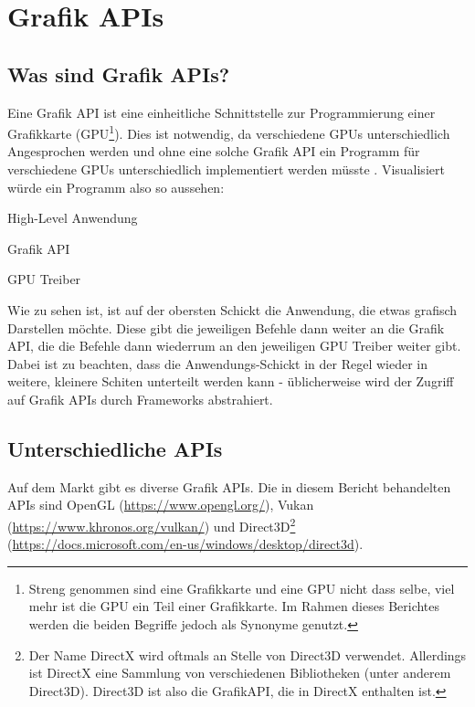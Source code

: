 
\section{Grafik APIs}

\subsection{Was sind Grafik APIs?}
Eine Grafik API ist eine einheitliche Schnittstelle zur Programmierung einer Grafikkarte (GPU\footnote{Streng genommen sind eine Grafikkarte und eine GPU nicht dass selbe, viel mehr ist die GPU ein Teil einer Grafikkarte. Im Rahmen dieses Berichtes werden die beiden Begriffe jedoch als Synonyme genutzt.}). Dies ist notwendig, da verschiedene GPUs unterschiedlich Angesprochen werden und ohne eine solche Grafik API ein Programm für verschiedene GPUs unterschiedlich implementiert werden müsste \cite{samsung_what_is_a_graphics_api}. Visualisiert würde ein Programm also so aussehen:

\begin{tcolorbox}
    \begin{tcolorbox}
        \begin{center}
            High-Level Anwendung
        \end{center}
    \end{tcolorbox}
    \begin{tcolorbox}
        \begin{center}
            Grafik API
        \end{center}
    \end{tcolorbox}
    \begin{tcolorbox}
        \begin{center}
            GPU Treiber
        \end{center}
    \end{tcolorbox}
\end{tcolorbox}

Wie zu sehen ist, ist auf der obersten Schickt die Anwendung, die etwas grafisch Darstellen möchte. Diese gibt die jeweiligen Befehle dann weiter an die Grafik API, die die Befehle dann wiederrum an den jeweiligen GPU Treiber weiter gibt. Dabei ist zu beachten, dass die Anwendungs-Schickt in der Regel wieder in weitere, kleinere Schiten unterteilt werden kann - üblicherweise wird der Zugriff auf Grafik APIs durch Frameworks abstrahiert.

\subsection{Unterschiedliche APIs}
Auf dem Markt gibt es diverse Grafik APIs. Die in diesem Bericht behandelten APIs sind OpenGL (\url{https://www.opengl.org/}), Vukan (\url{https://www.khronos.org/vulkan/}) und Direct3D\footnote{Der Name DirectX wird oftmals an Stelle von Direct3D verwendet. Allerdings ist DirectX eine Sammlung von verschiedenen Bibliotheken (unter anderem Direct3D). Direct3D ist also die GrafikAPI, die in DirectX enthalten ist.} (\url{https://docs.microsoft.com/en-us/windows/desktop/direct3d}).


